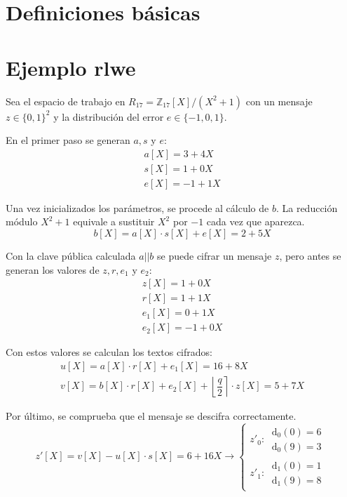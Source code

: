 \chapter{Definiciones básicas}
\label{chap:def}
\chapter{Ejemplo \gls{rlwe}}
\label{chap:ej:rlwe}
Sea el espacio de trabajo en $R_{17}=\mathbb{Z}_{17}[X]/\left(X^2+1\right)$ con un mensaje $z\in \{0,1\}^2$ y la distribución del error $e\in \{-1,0,1\}$.
\newline

En el primer paso se generan $a, s$ y $e$:
\begin{equation}
	\begin{array}{l}
		a[X]=3+4X\\
		s[X]=1+0X\\
		e[X]=-1+1X
	\end{array}
\end{equation}

Una vez inicializados los parámetros, se procede al cálculo de \(b\). La reducción módulo $X^2+1$ equivale a sustituir $X^2$ por $-1$ cada vez que aparezca.
\begin{equation}
	b[X]=a[X]\cdot s[X]+e[X]=2+5X
\end{equation}

Con la clave pública calculada \(a||b\) se puede cifrar un mensaje \(z\), pero antes se generan los valores de \(z, r, e_1\) y \(e_2\):
\begin{equation}
	\begin{array}{l}
		z[X]=1+0X\\
		r[X]=1+1X\\
		e_1[X]=0+1X\\
		e_2[X]=-1+0X
	\end{array}
\end{equation}

Con estos valores se calculan los textos cifrados:
\begin{equation}
	\begin{array}{l}
		u[X]=a[X]\cdot r[X]+e_1[X]=16+8X\\
		v[X]=b[X]\cdot r[X]+e_2[X]+\left\lfloor \dfrac{q}{2} \right\rceil \cdot z[X] =5+7X
	\end{array}
\end{equation}

Por último, se comprueba que el mensaje se descifra correctamente. 
\begin{equation}
	z'[X]=v[X]-u[X]\cdot s[X]=6+16X \rightarrow \left\{ \begin{array}{l}
		z'_0: \ \begin{array}{l}
			\text{d}_0(0) = 6 \\
			\text{d}_0(9) = 3
		\end{array} \\
		z'_1: \ \begin{array}{l}
			\text{d}_1(0) = 1 \\
			\text{d}_1(9) = 8
		\end{array}
	\end{array} \right.
\end{equation}

